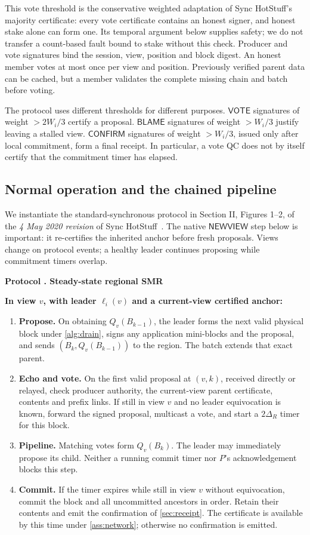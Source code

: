 \documentclass[11pt,a4paper,onecolumn]{article}
\newcommand{\Tag}[1]{\ensuremath{\mathsf{#1}}}
\newcounter{protocol}
\newenvironment{protocol}[2]{\refstepcounter{protocol}\label{#1}
\begin{mdframed}[nobreak=true,linewidth=.6pt,skipabove=9pt,skipbelow=9pt,
innertopmargin=7pt,innerbottommargin=7pt]\small
\noindent\textbf{Protocol \theprotocol. #2}\par\smallskip}{\end{mdframed}}
\begin{document}
This vote threshold is the conservative weighted adaptation of Sync HotStuff's
majority certificate: every vote certificate contains an honest signer, and honest
stake alone can form one. Its temporal argument below supplies safety;
we do not transfer a count-based fault bound to stake without this check.
Producer and vote signatures bind the session, view, position and block
digest. An honest member votes at most once per view and position.
Previously verified parent data can be cached, but a member validates the
complete missing chain and batch before voting.

The protocol uses different thresholds for different purposes.
\Tag{VOTE} signatures of weight $>2W_i/3$ certify a proposal.
\Tag{BLAME} signatures of weight $>W_i/3$ justify leaving a stalled view.
\Tag{CONFIRM} signatures of weight $>W_i/3$, issued only after local
commitment, form a final receipt. In particular, a vote QC does not by
itself certify that the commitment timer has elapsed.

\subsection{Normal operation and the chained pipeline}
We instantiate the standard-synchronous protocol in Section II, Figures 1--2,
of the \emph{4 May 2020 revision} of Sync HotStuff~\cite{synchotstuff}.
The native \Tag{NEWVIEW} step below is important: it re-certifies the inherited
anchor before fresh proposals. Views change on protocol events; a healthy
leader continues proposing while commitment timers overlap.

\begin{protocol}{alg:steady}{Steady-state regional SMR}
\textbf{In view $v$, with leader $\ell_i(v)$ and a current-view certified anchor:}
\begin{enumerate}[label=\textbf{S\arabic*.}]
\item \textbf{Propose.} On obtaining $Q_v(B_{k-1})$, the leader forms the
next valid physical block under \cref{alg:drain}, signs any application
mini-blocks and the proposal, and sends
$(B_k,Q_v(B_{k-1}))$ to the region. The batch extends that exact parent.
\item \textbf{Echo and vote.} On the first valid proposal at $(v,k)$, received
directly or relayed, check producer authority, the current-view parent
certificate, contents and prefix links. If still in view $v$ and no leader
equivocation is known, forward the signed proposal, multicast a vote, and
start a $2\Delta_R$ timer for this block.
\item \textbf{Pipeline.} Matching votes form $Q_v(B_k)$. The leader may
immediately propose its child. Neither a running commit timer nor $P$'s
acknowledgement blocks this step.
\item \textbf{Commit.} If the timer expires while still in view $v$ without
equivocation, commit the block and all uncommitted ancestors in order.
Retain their contents and emit the confirmation of \cref{sec:receipt}.
The certificate is available by this time under \cref{ass:network};
otherwise no confirmation is emitted.
\end{enumerate}
\end{protocol}
\end{document}
